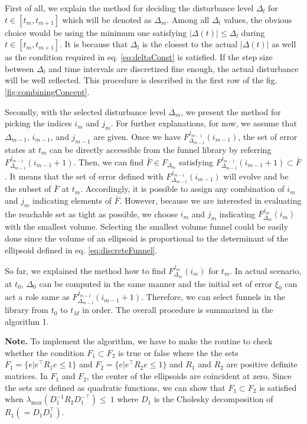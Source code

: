 \documentclass[letterpaper, 10 pt, conference]{ieeeconf}  %
\begin{document}
First of all, we explain the method for deciding the disturbance level $\Delta_l$ for $t \in [t_{m},t_{m+1}]$ which will be denoted as $\Delta_m$.
Among all $\Delta_l$ values, the obvious choice would be using the minimum one satisfying $|\Delta(t)| \leq \Delta_l$ during $t\in[t_{m},t_{m+1}]$. It is because that $\Delta_l$ is the closest to the actual $|\Delta(t)|$ as well as the condition required in eq. \eqref{eq:deltaConst} is satisfied.
If the step size between $\Delta_l$ and time intervals are discretized fine enough, the actual disturbance will be well reflected. 
This procedure is described in the first row of the fig. \ref{fig:combiningConcept}.

Secondly, with the selected disturbance level $\Delta_m$, we present the method for picking the indices $i_m$ and $j_m$. For further explanations, for now, we assume that $\Delta_{m-1}$, $i_{m-1}$, and $j_{m-1}$ are given.
Once we have $F_{\Delta_{m-1}}^{j_{m-1}}(i_{m-1})$, the set of error states at $t_m$ can be directly accessible from the funnel library by referring $F_{\Delta_{m-1}}^{j_{m-1}}(i_{m-1}+1)$. 
Then, we can find $\bar{F} \in F_{\Delta_m}$ satisfying $F_{\Delta_{m-1}}^{j_{m-1}}(i_{m-1}+1) \subset \bar{F}$.
It means that the set of error defined with $F_{\Delta_{m-1}}^{j_{m-1}}(i_{m-1})$ will evolve and be the subset of $\bar{F}$ at $t_m$. 
Accordingly, it is possible to assign any combination of $i_m$ and $j_m$ indicating elements of $\bar{F}$.
However, because we are interested in evaluating the reachable set as tight as possible, we choose $i_m$ and $j_m$ indicating $F_{\Delta_m}^{j_m}(i_m)$ with the smallest volume. 
Selecting the smallest volume funnel could be easily done since the volume of an ellipsoid is proportional to the determinant of the ellipsoid defined in eq. \eqref{eq:discreteFunnel}. 

So far, we explained the method how to find $F_{\Delta_m}^{j_m}(i_m)$ for $t_m$. In actual scenario, at $t_0$, $\Delta_0$ can be computed in the same manner and the initial set of error $\xi_0$ can act a role same as $F_{\Delta_{m-1}}^{j_{m-1}}(i_{m-1}+1)$.
Therefore, we can select funnels in the library from $t_0$ to $t_M$ in order.
The overall procedure is summarized in the algorithm 1.

\noindent\textbf{Note.} 
To implement the algorithm, we have to make the routine to check whether the condition $F_1 \subset F_2$ is true or false where the the sets $F_1 = \{e|e^\top R_1 e \leq 1\}$ and $F_2 = \{e|e^\top R_2 e \leq 1\}$ and  $R_1$ and $R_2$ are positive definite matrices.
In $F_1$ and $F_2$, the center of the ellipsoids are coincident at zero. 
Since the sets are defined as quadratic functions,
we can show that $F_1 \subset F_2$ is satisfied when $\lambda_{\max}(D_1^{-1}R_2D_1^{-\top} )\leq~1$ where $D_1$ is the Cholesky decomposition of $R_1( = D_1D_1^\top)$.
\end{document}
